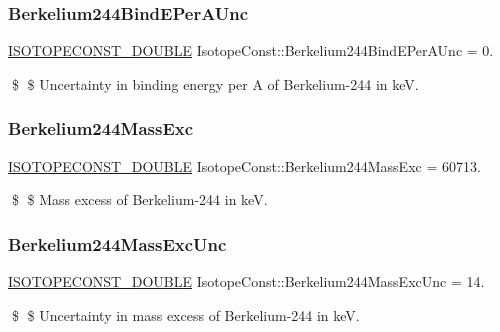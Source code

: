 \subsubsection{\texorpdfstring{Berkelium244\+Bind\+E\+Per\+A\+Unc}{Berkelium244BindEPerAUnc}}
{\footnotesize\ttfamily \mbox{\hyperlink{group___isotope_const-_macros_ga8f45a7272ce02c0b4c65c44636ed719a}{I\+S\+O\+T\+O\+P\+E\+C\+O\+N\+S\+T\+\_\+\+D\+O\+U\+B\+LE}} Isotope\+Const\+::\+Berkelium244\+Bind\+E\+Per\+A\+Unc = 0.}

\$ \$ Uncertainty in binding energy per A of Berkelium-\/244 in keV. \mbox{\label{group___isotope_const-_berkelium-_bk244_ga9c3d66a7dc6acc70a817a5dde3a30ef8}} 
\subsubsection{\texorpdfstring{Berkelium244\+Mass\+Exc}{Berkelium244MassExc}}
{\footnotesize\ttfamily \mbox{\hyperlink{group___isotope_const-_macros_ga8f45a7272ce02c0b4c65c44636ed719a}{I\+S\+O\+T\+O\+P\+E\+C\+O\+N\+S\+T\+\_\+\+D\+O\+U\+B\+LE}} Isotope\+Const\+::\+Berkelium244\+Mass\+Exc = 60713.}

\$ \$ Mass excess of Berkelium-\/244 in keV. \mbox{\label{group___isotope_const-_berkelium-_bk244_ga71d54238294c382673b83b3e819a145b}} 
\subsubsection{\texorpdfstring{Berkelium244\+Mass\+Exc\+Unc}{Berkelium244MassExcUnc}}
{\footnotesize\ttfamily \mbox{\hyperlink{group___isotope_const-_macros_ga8f45a7272ce02c0b4c65c44636ed719a}{I\+S\+O\+T\+O\+P\+E\+C\+O\+N\+S\+T\+\_\+\+D\+O\+U\+B\+LE}} Isotope\+Const\+::\+Berkelium244\+Mass\+Exc\+Unc = 14.}

\$ \$ Uncertainty in mass excess of Berkelium-\/244 in keV. \mbox{\label{group___isotope_const-_berkelium-_bk244_ga27f2d08555ddbd8eaa75bfacb9cc2fe0}} 
